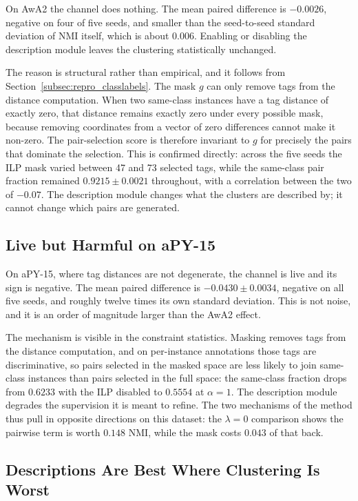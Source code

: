 On AwA2 the channel does nothing. The mean paired difference is $-0.0026$, negative on four of five seeds, and smaller than the seed-to-seed standard deviation of NMI itself, which is about $0.006$. Enabling or disabling the description module leaves the clustering statistically unchanged.

The reason is structural rather than empirical, and it follows from Section~\ref{subsec:repro_classlabels}. The mask $g$ can only remove tags from the distance computation. When two same-class instances have a tag distance of exactly zero, that distance remains exactly zero under every possible mask, because removing coordinates from a vector of zero differences cannot make it non-zero. The pair-selection score is therefore invariant to $g$ for precisely the pairs that dominate the selection. This is confirmed directly: across the five seeds the ILP mask varied between 47 and 73 selected tags, while the same-class pair fraction remained $0.9215 \pm 0.0021$ throughout, with a correlation between the two of $-0.07$. The description module changes what the clusters are described by; it cannot change which pairs are generated.

\subsection{Live but Harmful on aPY-15}
\label{subsec:repro_channel_apy}

On aPY-15, where tag distances are not degenerate, the channel is live and its sign is negative. The mean paired difference is $-0.0430 \pm 0.0034$, negative on all five seeds, and roughly twelve times its own standard deviation. This is not noise, and it is an order of magnitude larger than the AwA2 effect.

The mechanism is visible in the constraint statistics. Masking removes tags from the distance computation, and on per-instance annotations those tags are discriminative, so pairs selected in the masked space are less likely to join same-class instances than pairs selected in the full space: the same-class fraction drops from $0.6233$ with the ILP disabled to $0.5554$ at $\alpha = 1$. The description module degrades the supervision it is meant to refine. The two mechanisms of the method thus pull in opposite directions on this dataset: the $\lambda = 0$ comparison shows the pairwise term is worth $0.148$ NMI, while the mask costs $0.043$ of that back.

\subsection{Descriptions Are Best Where Clustering Is Worst}
\label{subsec:repro_tradeoff}

